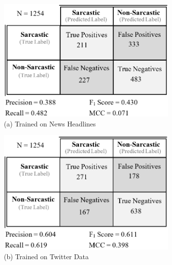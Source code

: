 \documentclass[12pt,a4paper]{article}
\begin{document}
\begin{minipage}{0.45\textwidth}
	\vspace{-5pt}\begin{figure}[H]
		\begin{center}
			\includegraphics[width=0.8\textwidth]{Images/cm2.png}\\
			(a) Trained on News Headlines\\
		\end{center}
	\end{figure}
\end{minipage}
\begin{minipage}{0.45\textwidth}
	\vspace{-5pt}\begin{figure}[H]
		\begin{center}
			\includegraphics[width=0.8\textwidth]{Images/cm1.png}\\
			(b) Trained on Twitter Data\\
		\end{center}
	\end{figure}
\end{minipage}\vspace{-17pt}
\end{document}
